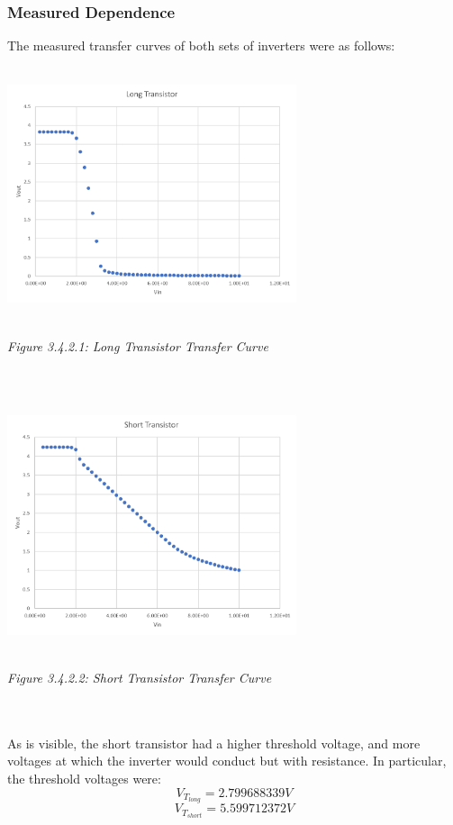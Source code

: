 \documentclass[12pt]{article}
\begin{document}
\subsubsection{Measured Dependence}
The measured transfer curves of both sets of inverters were as follows:
\\
\\\centerline{\includegraphics[width=8.5cm] {Long.PNG}}
\begin{center}
\\\emph{Figure 3.4.2.1: Long Transistor Transfer Curve}
\end{center}
\\
\\\centerline{\includegraphics[width=8.5cm] {Short.PNG}}
\begin{center}
\\\emph{Figure 3.4.2.2: Short Transistor Transfer Curve}
\end{center}
\\
\\As is visible, the short transistor had a higher threshold voltage, and more voltages at which the inverter would conduct but with resistance. In particular, the threshold voltages were:
    \[V_{T_{long}} = 2.799688339V \]
    \[V_{T_{short}} = 5.599712372V \]
    
\end{document}
